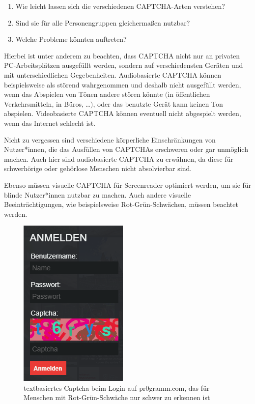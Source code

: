 \begin{enumerate}
\item Wie leicht lassen sich die verschiedenen CAPTCHA-Arten verstehen?
\item Sind sie für alle Personengruppen gleichermaßen nutzbar?
\item Welche Probleme könnten auftreten?
\end{enumerate}

Hierbei ist unter anderem zu beachten, dass CAPTCHA nicht nur an privaten PC-Arbeitsplätzen ausgefüllt werden,
sondern auf verschiedensten Geräten und mit unterschiedlichen Gegebenheiten.
Audiobasierte CAPTCHA können beispielsweise als störend wahrgenommen und deshalb nicht ausgefüllt werden,
wenn das Abspielen von Tönen andere stören könnte $($in öffentlichen Verkehrsmitteln, in Büros, \dots$)$,
oder das benutzte Gerät kann keinen Ton abspielen. Videobasierte CAPTCHA können eventuell nicht abgespielt werden,
wenn das Internet schlecht ist.

Nicht zu vergessen sind verschiedene körperliche Einschränkungen von Nutzer*innen,
die das Ausfüllen von CAPTCHAs erschweren oder gar unmöglich machen. Auch hier sind audiobasierte CAPTCHA zu erwähnen,
da diese für schwerhörige oder gehörlose Menschen nicht absolvierbar sind.

Ebenso müssen visuelle CAPTCHA für Screenreader optimiert werden, um sie für blinde Nutzer*innen nutzbar zu machen.
Auch andere visuelle Beeinträchtigungen, wie beispielsweise Rot-Grün-Schwächen, müssen beachtet werden.

\begin{figure}
    \centering
    \includegraphics{gfx/mygraphics/pr0grammcaptcha.png}
    \caption{textbasiertes Captcha beim Login auf pr$0$gramm.com, das für Menschen mit Rot-Grün-Schwäche nur schwer zu erkennen ist}
\end{figure}

